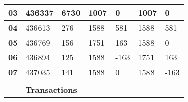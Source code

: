 \documentclass[../main.tex]{subfiles}
\begin{document}
\begin{table}[ht]
{\begin{tabular}{lllllll}
            \multicolumn{1}{|l|}{\textbf{03}}                  & \multicolumn{1}{l|}{436337}                                                        & \multicolumn{1}{l|}{6730}               & \multicolumn{1}{l|}{1007}               & \multicolumn{1}{l|}{0}          & \multicolumn{1}{l|}{1007}            & \multicolumn{1}{l|}{0}          \\ \hline
            \multicolumn{1}{|l|}{\textbf{04}}                  & \multicolumn{1}{l|}{436613}                                                        & \multicolumn{1}{l|}{276}                & \multicolumn{1}{l|}{1588}               & \multicolumn{1}{l|}{581}        & \multicolumn{1}{l|}{1588}            & \multicolumn{1}{l|}{581}        \\ \hline
            \multicolumn{1}{|l|}{\textbf{05}}                  & \multicolumn{1}{l|}{436769}                                                        & \multicolumn{1}{l|}{156}                & \multicolumn{1}{l|}{1751}               & \multicolumn{1}{l|}{163}        & \multicolumn{1}{l|}{1588}            & \multicolumn{1}{l|}{0}          \\ \hline
            \multicolumn{1}{|l|}{\textbf{06}}                  & \multicolumn{1}{l|}{436894}                                                        & \multicolumn{1}{l|}{125}                & \multicolumn{1}{l|}{1588}               & \multicolumn{1}{l|}{-163}       & \multicolumn{1}{l|}{1751}            & \multicolumn{1}{l|}{163}        \\ \hline
            \multicolumn{1}{|l|}{\textbf{07}}                  & \multicolumn{1}{l|}{437035}                                                        & \multicolumn{1}{l|}{141}                & \multicolumn{1}{l|}{1588}               & \multicolumn{1}{l|}{0}          & \multicolumn{1}{l|}{1588}            & \multicolumn{1}{l|}{-163}       \\ \hline
                                                               &                                                                                    &                                         &                                         &                                 &                                      &                                 \\ \cline{2-7}
            \multicolumn{1}{l|}{}                              & \multicolumn{6}{l|}{\textbf{Transactions}}                                                                                                                                                                                                                                        \\ \cline{2-7}

\end{tabular}}
\end{table}
\end{document}
